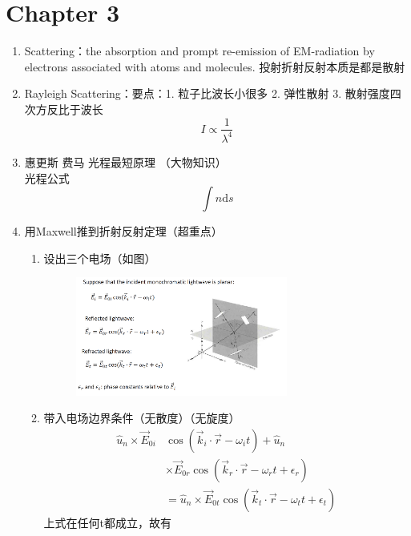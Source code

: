 \documentclass{ctexart}
\begin{document}
\section{Chapter 3}
\begin{enumerate}
\item Scattering：the absorption and prompt re-emission of EM-radiation by electrons associated with atoms and molecules. 投射折射反射本质是都是散射
\item Rayleigh Scattering：要点：1. 粒子比波长小很多 2. 弹性散射 3. 散射强度四次方反比于波长
\begin{equation}
I \propto \frac{1}{\lambda^{4}}
\end{equation}
\item 惠更斯 费马 光程最短原理 （大物知识）\\
光程公式
\begin{equation}
\int n \text{d} s
\end{equation}
\item 用Maxwell推到折射反射定理（超重点）
\begin{enumerate}
\item 设出三个电场（如图）
\begin{figure}
\center
\includegraphics[width=0.7\textwidth]{界面电场.png}
\end{figure}
\item 带入电场边界条件（无散度）（无旋度）
\begin{equation}
\begin{array}{rl}{\hat{u}_{n} \times \vec{E}_{0 i}} & {\cos \left(\vec{k}_{i} \cdot \vec{r}-\omega_{i} t\right)+\hat{u}_{n}} \\ {} & {\times \vec{E}_{0 r} \cos \left(\vec{k}_{r} \cdot \vec{r}-\omega_{r} t+\epsilon_{r}\right)} \\ {} & {=\hat{u}_{n} \times \vec{E}_{0 t} \cos \left(\vec{k}_{t} \cdot \vec{r}-\omega_{t} t+\epsilon_{t}\right)}\end{array}
\end{equation}
上式在任何t都成立，故有
\begin{equation}

\end{equation}
\end{enumerate}
\end{enumerate}
\end{document}
